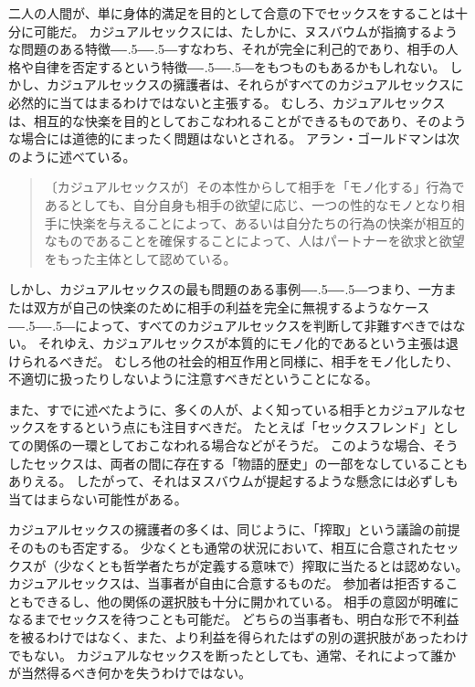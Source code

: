 \documentclass[paper=a4,book,openany]{jlreq}
\newcommand{\ig}[1]{}           %
\def\DDASH{―\kern-.5\zw―\kern-.5\zw―} %
\begin{document}
二人の人間が、単に身体的満足を目的として合意の下でセックスをすることは十分に可能だ。
カジュアルセックスには、たしかに、ヌスバウムが指摘するような問題のある特徴{\DDASH}すなわち、それが完全に利己的であり、相手の人格や自律を否定するという特徴{\DDASH}をもつものもあるかもしれない。
しかし、カジュアルセックスの擁護者は、それらがすべてのカジュアルセックスに必然的に当てはまるわけではないと主張する。
むしろ、カジュアルセックスは、相互的な快楽を目的としておこなわれることができるものであり、そのような場合には道徳的にまったく問題はないとされる。
アラン・ゴールドマンは次のように述べている。

\begin{quote}
〔カジュアルセックスが〕その本性からして相手を「モノ化する」行為であるとしても、自分自身も相手の欲望に応じ、一つの性的なモノとなり相手に快楽を与えることによって、あるいは自分たちの行為の快楽が相互的なものであることを確保することによって、人はパートナーを欲求と欲望をもった主体として認めている。
\citep[p.283]{goldman77:_plain_sex}\ig{Alan Goldman}
\end{quote}

しかし、カジュアルセックスの最も問題のある事例{\DDASH}つまり、一方または双方が自己の快楽のために相手の利益を完全に無視するようなケース{\DDASH}によって、すべてのカジュアルセックスを判断して非難すべきではない。
それゆえ、カジュアルセックスが本質的にモノ化的であるという主張は退けられるべきだ。
むしろ他の社会的相互作用と同様に、相手をモノ化したり、不適切に扱ったりしないように注意すべきだということになる。

また、すでに述べたように、多くの人が、よく知っている相手とカジュアルなセックスをするという点にも注目すべきだ。
たとえば「セックスフレンド」としての関係の一環としておこなわれる場合などがそうだ。
このような場合、そうしたセックスは、両者の間に存在する「物語的歴史」の一部をなしていることもありえる。
したがって、それはヌスバウムが提起するような懸念には必ずしも当てはまらない可能性がある。

カジュアルセックスの擁護者の多くは、同じように、「搾取」という議論の前提そのものも否定する。
少なくとも通常の状況において、相互に合意されたセックスが（少なくとも哲学者たちが定義する意味で）搾取に当たるとは認めない。
カジュアルセックスは、当事者が自由に合意するものだ。
参加者は拒否することもできるし、他の関係の選択肢も十分に開かれている。
相手の意図が明確になるまでセックスを待つことも可能だ。
どちらの当事者も、明白な形で不利益を被るわけではなく、また、より利益を得られたはずの別の選択肢があったわけでもない。
カジュアルなセックスを断ったとしても、通常、それによって誰かが当然得るべき何かを失うわけではない。
\end{document}
